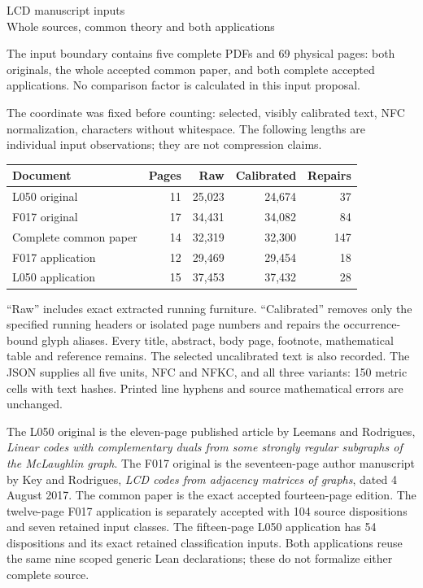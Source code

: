 \documentclass[11pt]{article}
\begin{document}
\begin{center}\Large LCD manuscript inputs\\[3pt]\normalsize Whole sources, common theory and both applications\end{center}

The input boundary contains five complete PDFs and 69 physical pages: both
originals, the whole accepted common paper, and both complete accepted
applications. No comparison factor is calculated in this input proposal.

The coordinate was fixed before counting: selected, visibly calibrated text,
NFC normalization, characters without whitespace. The following lengths are
individual input observations; they are not compression claims.

\begin{center}\small
\begin{tabular}{lrrrr}\toprule
Document & Pages & Raw & Calibrated & Repairs\\\midrule
L050 original & 11 & 25,023 & 24,674 & 37 \\
F017 original & 17 & 34,431 & 34,082 & 84 \\
Complete common paper & 14 & 32,319 & 32,300 & 147 \\
F017 application & 12 & 29,469 & 29,454 & 18 \\
L050 application & 15 & 37,453 & 37,432 & 28 \\
\bottomrule\end{tabular}\end{center}

``Raw'' includes exact extracted running furniture. ``Calibrated'' removes only
the specified running headers or isolated page numbers and repairs the
occurrence-bound glyph aliases. Every title, abstract, body page, footnote,
mathematical table and reference remains. The selected uncalibrated text is also
recorded. The JSON supplies all five units, NFC and NFKC, and all three variants:
150 metric cells with text hashes. Printed line hyphens and source mathematical
errors are unchanged.

The L050 original is the eleven-page published article by Leemans and Rodrigues,
\emph{Linear codes with complementary duals from some strongly regular
subgraphs of the McLaughlin graph}. The F017 original is the seventeen-page
author manuscript by Key and Rodrigues, \emph{LCD codes from adjacency matrices
of graphs}, dated 4 August 2017. The common paper is the exact accepted
fourteen-page edition. The twelve-page F017 application is separately accepted
with 104 source dispositions and seven retained input classes. The fifteen-page
L050 application has 54 dispositions and its exact retained classification
inputs. Both applications reuse the same nine scoped generic Lean declarations;
these do not formalize either complete source.
\end{document}
